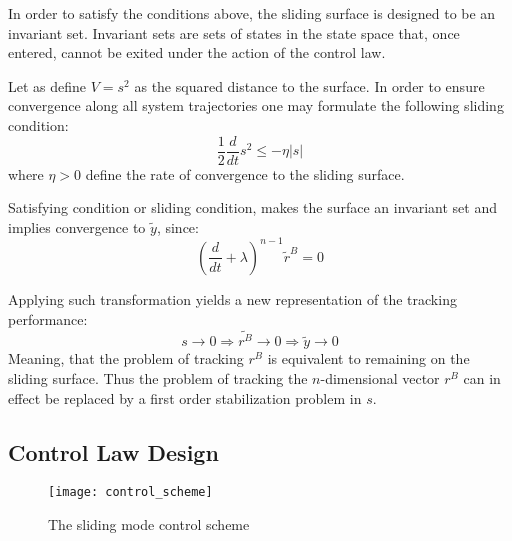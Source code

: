 In order to satisfy the conditions above, the sliding surface is designed to be an invariant set. Invariant sets are sets
of states in the state space that, once entered, cannot be exited under the action
of the control law.

Let as define $V = s^2$ as the squared distance to the surface.
In order to ensure convergence along all system trajectories one may
formulate the following sliding condition:
$$
    \frac{1}{2}\frac{d}{dt}s^2 \leq -\eta |s|
$$
where $\eta>0$ define the rate of convergence to the sliding surface.

Satisfying condition or sliding condition, makes the surface an invariant set
and implies convergence to $\tilde{y}$, since:
$$
    (\frac{d}{dt} + \lambda)^{n-1}\tilde r^B = 0
$$

Applying such transformation yields a new representation of the tracking performance:
$$
    s \rightarrow 0 \Rightarrow \tilde{r^B} \rightarrow 0 \Rightarrow \tilde{y} \rightarrow 0
$$
Meaning, that the problem of tracking $r^B$ is equivalent to remaining on
the sliding surface. Thus the problem of tracking the $n$-dimensional vector $r^B$
can in effect be replaced by a first order stabilization problem in $s$.

\subsection{Control Law Design}


\begin{figure}[H]
    \centering\texttt{[image: control\_scheme]}
    \caption{The sliding mode control scheme}
    \label{image:control_scheme}
\end{figure}


